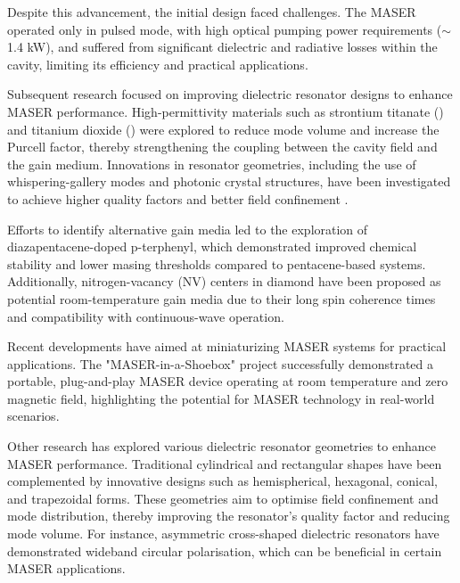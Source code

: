 Despite this advancement, the initial design faced challenges. The MASER
operated only in pulsed mode, with high optical pumping power requirements
($\sim$ 1.4 kW), and suffered from significant dielectric and radiative losses
within the cavity, limiting its efficiency and practical
applications\autocite{
  salvadori2017nanosecond,arroo2021perspective,breeze2015enhanced
}.

Subsequent research focused on improving dielectric resonator designs to enhance
MASER performance. High-permittivity materials such as strontium titanate
() and titanium dioxide () were explored to reduce mode
volume and increase the Purcell factor, thereby strengthening the coupling
between the cavity field and the gain
medium\autocite{howard1991rutile, goryachev2015sto, rupprecht1962sto}.
Innovations in resonator geometries, including the use of whispering-gallery
modes and photonic crystal structures, have been investigated to achieve higher
quality factors and better field confinement
\autocite{
  rybin2017high, campione2016broken, oxborrow2007traceable, krupka1999whispering
}.

Efforts to identify alternative gain media led to the exploration of
diazapentacene-doped p-terphenyl, which demonstrated improved chemical stability
and lower masing thresholds compared to pentacene-based systems. Additionally,
nitrogen-vacancy (NV) centers in diamond have been proposed as potential
room-temperature gain media due to their long spin coherence times and
compatibility with continuous-wave
operation\autocite{
  breeze2018continuous,sherman2022diamond,sherman2021performance,jin2015proposal
}.

Recent developments have aimed at miniaturizing MASER systems for practical
applications. The "MASER-in-a-Shoebox" project successfully demonstrated a
portable, plug-and-play MASER device operating at room temperature and zero
magnetic field, highlighting the potential for MASER technology in real-world
scenarios\autocite{ng2023maser}.

Other research has explored various dielectric resonator geometries to enhance
MASER performance. Traditional cylindrical and rectangular shapes have been
complemented by innovative designs such as hemispherical, hexagonal, conical,
and trapezoidal forms\autocite{meher2020design}. These geometries aim to
optimise field confinement and mode distribution, thereby improving the
resonator's quality factor and reducing mode
volume\autocite{rybin2017high, campione2016broken}. For instance, asymmetric
cross-shaped dielectric resonators have demonstrated wideband circular
polarisation, which can be beneficial in certain MASER applications.

